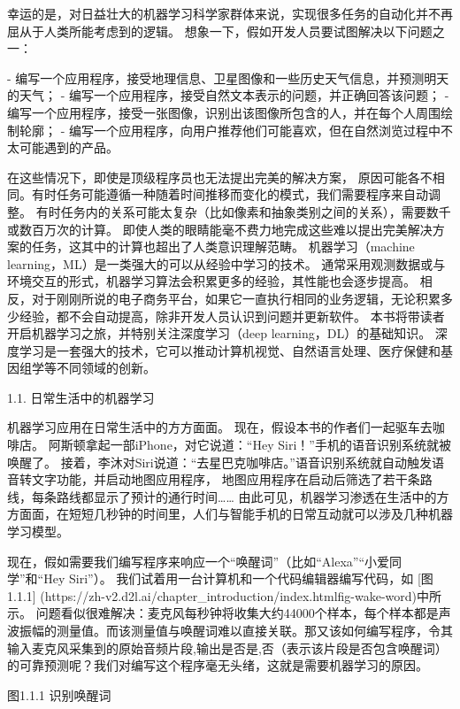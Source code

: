 幸运的是，对日益壮大的机器学习科学家群体来说，实现很多任务的自动化并不再屈从于人类所能考虑到的逻辑。 想象一下，假如开发人员要试图解决以下问题之一：

- 编写一个应用程序，接受地理信息、卫星图像和一些历史天气信息，并预测明天的天气；
- 编写一个应用程序，接受自然文本表示的问题，并正确回答该问题；
- 编写一个应用程序，接受一张图像，识别出该图像所包含的人，并在每个人周围绘制轮廓；
- 编写一个应用程序，向用户推荐他们可能喜欢，但在自然浏览过程中不太可能遇到的产品。

在这些情况下，即使是顶级程序员也无法提出完美的解决方案， 原因可能各不相同。有时任务可能遵循一种随着时间推移而变化的模式，我们需要程序来自动调整。 有时任务内的关系可能太复杂（比如像素和抽象类别之间的关系），需要数千或数百万次的计算。 即使人类的眼睛能毫不费力地完成这些难以提出完美解决方案的任务，这其中的计算也超出了人类意识理解范畴。 机器学习（machine learning，ML）是一类强大的可以从经验中学习的技术。 通常采用观测数据或与环境交互的形式，机器学习算法会积累更多的经验，其性能也会逐步提高。 相反，对于刚刚所说的电子商务平台，如果它一直执行相同的业务逻辑，无论积累多少经验，都不会自动提高，除非开发人员认识到问题并更新软件。 本书将带读者开启机器学习之旅，并特别关注深度学习（deep learning，DL）的基础知识。 深度学习是一套强大的技术，它可以推动计算机视觉、自然语言处理、医疗保健和基因组学等不同领域的创新。

 1.1. 日常生活中的机器学习

机器学习应用在日常生活中的方方面面。 现在，假设本书的作者们一起驱车去咖啡店。 阿斯顿拿起一部iPhone，对它说道：“Hey Siri！”手机的语音识别系统就被唤醒了。 接着，李沐对Siri说道：“去星巴克咖啡店。”语音识别系统就自动触发语音转文字功能，并启动地图应用程序， 地图应用程序在启动后筛选了若干条路线，每条路线都显示了预计的通行时间…… 由此可见，机器学习渗透在生活中的方方面面，在短短几秒钟的时间里，人们与智能手机的日常互动就可以涉及几种机器学习模型。

现在，假如需要我们编写程序来响应一个“唤醒词”（比如“Alexa”“小爱同学”和“Hey Siri”）。 我们试着用一台计算机和一个代码编辑器编写代码，如 [图1.1.1]
(https://zh-v2.d2l.ai/chapter\_introduction/index.htmlfig-wake-word)中所示。 问题看似很难解决：麦克风每秒钟将收集大约44000个样本，每个样本都是声波振幅的测量值。而该测量值与唤醒词难以直接关联。那又该如何编写程序，令其输入麦克风采集到的原始音频片段,输出是否{是,否}（表示该片段是否包含唤醒词）的可靠预测呢？我们对编写这个程序毫无头绪，这就是需要机器学习的原因。


图1.1.1 识别唤醒词

